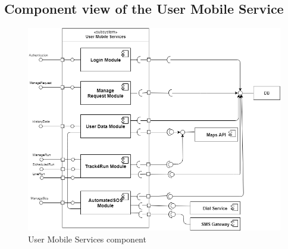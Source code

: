 \subsection{Component view of the User Mobile Service}

\begin{figure}[H]
    \centering
    \includegraphics[scale=0.4]{./Pictures/UserServicesDiagram.png}
    \caption{User Mobile Services component }
\end{figure}

